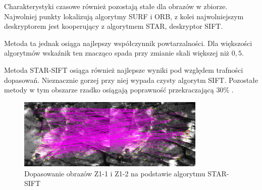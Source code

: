 Charakterystyki czasowe również pozostają stałe dla obrazów w zbiorze. Najwolniej punkty lokalizują algorytmy SURF i ORB, z kolei najwolniejszym deskryptorem jest kooperujący z algorytmem STAR, deskryptor SIFT.

Metoda ta jednak osiąga najlepszy współczynnik powtarzalności. Dla większości algorytmów wskaźnik ten znacząco spada przy zmianie skali większej niż $0,5$.

Metoda STAR-SIFT osiąga również najlepsze wyniki pod względem trafności dopasowań. Nieznacznie gorzej przy niej wypada czysty algorytm SIFT. Pozostałe metody w tym obszarze rzadko osiągają poprawność przekraczającą $30\% $ .

\begin{figure}
\centering
\includegraphics[width=0.8\textwidth]{pict/badania/z1_star_sift_1_2.png}
\caption{Dopasowanie obrazów Z1-1 i Z1-2 na podstawie algorytmu STAR-SIFT}
\end{figure}
